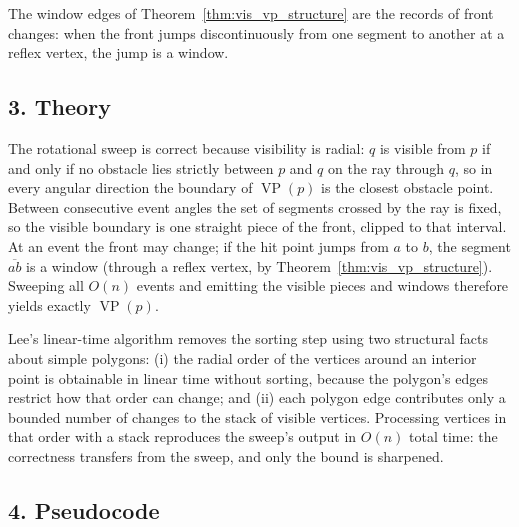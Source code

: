 The window edges of Theorem~\ref{thm:vis_vp_structure} are the records of
front changes: when the front jumps discontinuously from one segment to
another at a reflex vertex, the jump is a window.

\subsection{3. Theory}

The rotational sweep is correct because visibility is radial: $q$ is
visible from $p$ if and only if no obstacle lies strictly between $p$ and
$q$ on the ray through $q$, so in every angular direction the boundary of
$\operatorname{VP}(p)$ is the closest obstacle point. Between consecutive
event angles the set of segments crossed by the ray is fixed, so the visible
boundary is one straight piece of the front, clipped to that interval. At an
event the front may change; if the hit point jumps from $a$ to $b$, the
segment $\overline{ab}$ is a window (through a reflex vertex, by
Theorem~\ref{thm:vis_vp_structure}). Sweeping all $O(n)$ events and emitting
the visible pieces and windows therefore yields exactly
$\operatorname{VP}(p)$.

Lee's linear-time algorithm \cite{lee1983} removes the sorting step using
two structural facts about simple polygons: (i) the radial order of the
vertices around an interior point is obtainable in linear time without
sorting, because the polygon's edges restrict how that order can change; and
(ii) each polygon edge contributes only a bounded number of changes to the
stack of visible vertices. Processing vertices in that order with a stack
reproduces the sweep's output in $O(n)$ total time: the correctness transfers
from the sweep, and only the bound is sharpened.

\subsection{4. Pseudocode}

